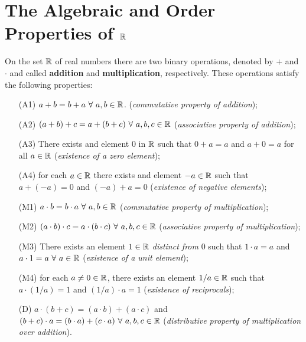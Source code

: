 \section{The Algebraic and Order Properties of $\mathbb{R}$}

\begin{theorem}
	On the set $\mathbb{R}$ of real numbers there are two binary operations, denoted by $+$ and $\cdot$ and called \textbf{addition} and \textbf{multiplication}, respectively. These operations satisfy the following properties:
	\begin{enumerate}
		\item[(A1)] $a+b=b+a\ \forall\ a,b \in \mathbb{R}$. (\textit{commutative property of addition});

		\item[(A2)] $(a+b)+c=a+(b+c)\ \forall\ a,b,c \in \mathbb{R}$ (\textit{associative property of addition});

		\item[(A3)] There exists and element $0$ in $\mathbb{R}$ such that $0+a=a$ and $a+0=a$ for all $a \in \mathbb{R}$ (\textit{existence of a zero element});

		\item[(A4)] for each $a \in \mathbb{R}$ there exists and element $-a \in \mathbb{R}$ such that $a + (-a)=0$ and $(-a) + a=0$ (\textit{existence of negative elements});

		\item[(M1)] $a \cdot b=b \cdot a\ \forall\ a,b \in \mathbb{R}$ (\textit{commutative property of multiplication});

		\item[(M2)] $(a \cdot b) \cdot c = a \cdot (b \cdot c)\ \forall\ a,b,c \in \mathbb{R}$ (\textit{associative property of multiplication});

		\item[(M3)] There exists an element $1 \in \mathbb{R}$ \textit{distinct from} $0$ such that $1 \cdot a=a$ and $a \cdot 1 = a\ \forall\ a \in \mathbb{R}$ (\textit{existence of a unit element});

		\item[(M4)] for each $a \neq 0 \in \mathbb{R}$, there exists an element $1/a \in \mathbb{R}$ such that $a \cdot (1/a) = 1$ and $(1/a) \cdot a = 1$ (\textit{existence of reciprocals});

			\item[(D)]$a \cdot (b+c)=(a \cdot b) + (a \cdot c)$ and $(b+c)\cdot a = (b \cdot a) + (c \cdot a)\ \forall\ a,b,c \in \R$ (\textit{distributive property of multiplication over addition}).
	\end{enumerate}
\end{theorem}

